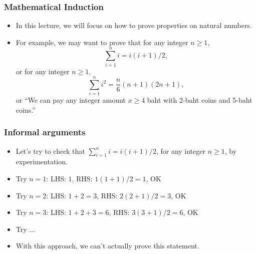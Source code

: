

\begin{frame}\frametitle{Mathematical Induction}
  \begin{itemize}
  \item In this lecture, we will focus on how to prove properties on natural numbers. \pause
  \item For example, we may want to prove that for any integer $n\geq 1$,
    \[ \sum_{i=1}^n i = i(i+1)/2, \]
    \pause
    or for any integer $n\geq 1$,
    \[ \sum_{i=1}^n i^2 = \frac{n}{6}(n+1)(2n+1),\]
    \pause
    or ``We can pay any integer amount $x\geq 4$ baht with 2-baht
    coins and 5-baht coins.''
  \end{itemize}
\end{frame}

\begin{frame}\frametitle{Informal arguments}
  \begin{itemize}
  \item Let's try to check that $\sum_{i=1}^n i = i(i+1)/2$, for any
    integer $n\geq 1$, by experimentation.
  \item Try $n=1$: \pause LHS: $1$, \pause RHS: $1(1+1)/2 = 1$, \pause OK
  \item Try $n=2$: \pause LHS: $1+2=3$, \pause RHS: $2(2+1)/2 = 3$, \pause OK
  \item Try $n=3$: \pause LHS: $1+2+3=6$, \pause RHS: $3(3+1)/2 = 6$, \pause OK
  \item Try ... \pause
  \item With this approach, we can't actually prove this statement.
  \end{itemize}
\end{frame}
